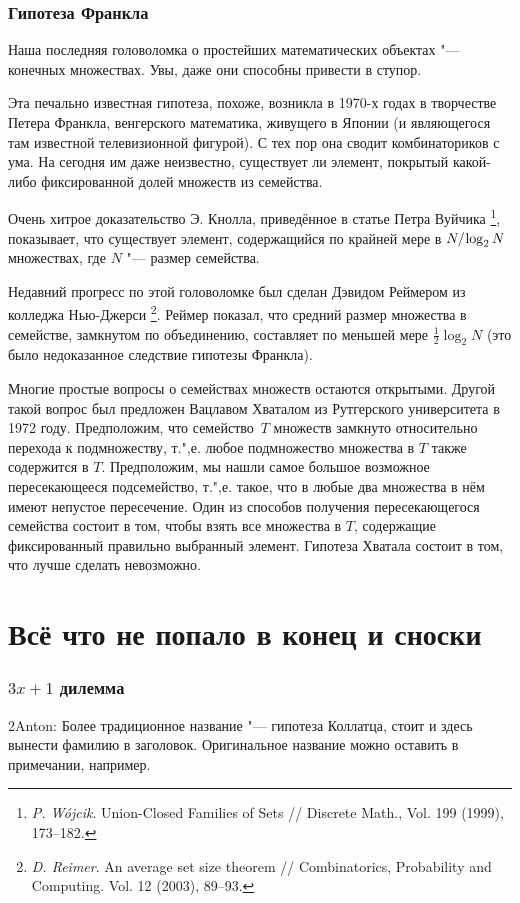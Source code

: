 \documentclass[twoside]{book}
\begin{document}
\subsubsection*{Гипотеза Франкла}

Наша последняя головоломка о простейших математических объектах "--- конечных множествах.
Увы, даже они способны привести в ступор.

Эта печально известная гипотеза, похоже, возникла в 1970-х годах в творчестве Петера Франкла, венгерского математика, живущего в Японии (и являющегося там известной телевизионной фигурой).
С тех пор она сводит комбинаториков с ума. 
На сегодня им даже неизвестно, существует ли элемент, покрытый какой-либо фиксированной долей множеств из семейства.

Очень хитрое доказательство Э. Кнолла, приведённое в статье Петра Вуйчика%
\footnote{\emph{P. W\'{o}jcik}. Union-Closed Families of Sets /\!/ {Discrete Math.}, Vol. 199 (1999), 173--182.},
показывает, что существует элемент, содержащийся по крайней мере в $N/\mkern-2mu\log_2 N$ множествах, где $N$ "--- размер семейства.

Недавний прогресс по этой головоломке был сделан Дэвидом Реймером из колледжа Нью-Джерси%
\footnote{\emph{D. Reimer}. An average set size theorem /\!/ {Combinatorics, Probability and Computing.} Vol. 12 (2003), 89--93.}.
Реймер показал, что средний размер множества в семействе, замкнутом по объединению, составляет по меньшей мере $\tfrac12\log_2N$ (это было недоказанное следствие гипотезы Франкла).

Многие простые вопросы о семействах множеств остаются открытыми.
Другой такой вопрос был предложен Вацлавом Хваталом из Рутгерского университета в 1972 году.
Предположим, что семейство~$T$ множеств замкнуто относительно перехода к подмножеству, т.",е. любое подмножество множества в $T$ также содержится в $T$.
Предположим,  мы нашли самое большое возможное пересекающееся подсемейство, т.",е. такое, что в любые два множества в нём имеют непустое пересечение.
Один из способов получения пересекающегося семейства состоит в том, чтобы взять все множества в $T$, содержащие фиксированный правильно выбранный элемент.
Гипотеза Хватала состоит в том, что лучше сделать невозможно.

\section*{Всё что не попало в конец и сноски}

\subsubsection*{$3x+1$ дилемма}
2Anton: Более традиционное название "--- гипотеза Коллатца,  стоит и здесь вынести фамилию в заголовок.
Оригинальное название можно оставить в примечании, например.
\end{document}
